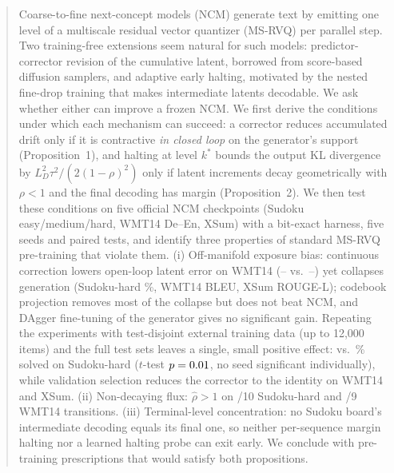 \begin{abstract}
Coarse-to-fine next-concept models (NCM) generate text by emitting one level of a multiscale residual vector quantizer (MS-RVQ) per parallel step. Two training-free extensions seem natural for such models: predictor-corrector revision of the cumulative latent, borrowed from score-based diffusion samplers, and adaptive early halting, motivated by the nested fine-drop training that makes intermediate latents decodable. We ask whether either can improve a frozen NCM. We first derive the conditions under which each mechanism can succeed: a corrector reduces accumulated drift only if it is contractive \emph{in closed loop} on the generator's support (Proposition~1), and halting at level $k^\ast$ bounds the output KL divergence by $L_D^2\tau^2/(2(1-\rho)^2)$ only if latent increments decay geometrically with $\rho<1$ and the final decoding has margin (Proposition~2). We then test these conditions on five official NCM checkpoints (Sudoku easy/medium/hard, WMT14 De--En, XSum) with a bit-exact harness, five seeds and paired tests, and identify three properties of standard MS-RVQ pre-training that violate them. (i) Off-manifold exposure bias: continuous correction lowers open-loop latent error on WMT14 (\WmtMseLo--\WmtMseHi{} vs.\ \WmtUncLo--\WmtUncHi) yet collapses generation (Sudoku-hard \LoopVoneHard\%, WMT14 \LoopVoneWmt{} BLEU, XSum \LoopVoneXsum{} ROUGE-L); codebook projection removes most of the collapse but does not beat NCM, and DAgger fine-tuning of the generator gives no significant gain. Repeating the experiments with test-disjoint external training data (up to 12{,}000 items) and the full test sets leaves a single, small positive effect: \VfLoopSelHard{} vs.\ \VfBaseHard\% solved on Sudoku-hard ($t$-test $p=\VfLoopSelHardP$, no seed significant individually), while validation selection reduces the corrector to the identity on WMT14 and XSum. (ii) Non-decaying flux: $\hat\rho>1$ on \RhoGtOneSud{}/10 Sudoku-hard and \RhoGtOneWmt{}/9 WMT14 transitions. (iii) Terminal-level concentration: no Sudoku board's intermediate decoding equals its final one, so neither per-sequence margin halting nor a learned halting probe can exit early. We conclude with pre-training prescriptions that would satisfy both propositions.
\end{abstract}
